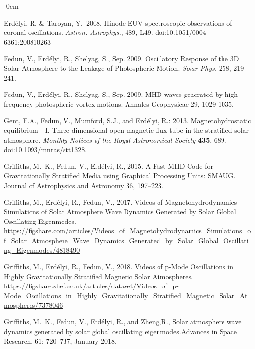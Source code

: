 \documentclass[physics,article,submit,pdftex,moreauthors]{Definitions/mdpi}
\newcommand{\aap}{{\it Astron. Astrophys.}}
\newcommand{\solphys}{{\it Solar Phys.}}
\begin{document}
\begin{adjustwidth}{-\extralength}{0cm}
\begin{thebibliography}{999}
 Erd{\'e}lyi, R. \& Taroyan, Y.\ 2008. {Hinode EUV spectroscopic observations of coronal oscillations}. \aap, 489, L49. doi:10.1051/0004-6361:200810263

{Fedun}, V., {Erd{\'e}lyi}, R., {Shelyag}, S., Sep. 2009. {Oscillatory Response
  of the 3D Solar Atmosphere to the Leakage of Photospheric Motion}. \solphys
  258, 219--241.

{Fedun}, V., {Erd{\'e}lyi}, R., {Shelyag}, S., Sep. 2009. {MHD waves generated by high-frequency photospheric vortex motions}. Annales Geophysicae
  29, 1029-1035.

Gent, F.A., Fedun, V., Mumford, S.J., and Erd{\'e}lyi, R.: 2013. {Magnetohydrostatic equilibrium - I. Three-dimensional open magnetic flux tube in the stratified solar atmosphere}. {\it Monthly Notices of the Royal Astronomical Society} {\bf 435}, 689. doi:10.1093/mnras/stt1328.


{Griffiths}, M.~K., {Fedun}, V., {Erd{\'e}lyi}, R., 2015. {A Fast MHD Code for
  Gravitationally Stratified Media using Graphical Processing Units: SMAUG}.
  Journal of Astrophysics and Astronomy 36, 197--223.

{Griffiths}, M., {Erd{\'e}lyi}, R., {Fedun}, V., 2017. {Videos of
  Magnetohydrodynamics Simulations of Solar Atmosphere Wave Dynamics Generated
  by Solar Global Oscillating Eigenmodes}.
\newline \url{https://figshare.com/articles/Videos_of_Magnetohydrodynamics_Simulations_of_Solar_Atmosphere_Wave_Dynamics_Generated_by_Solar_Global_Oscillating_Eigenmodes/4818490}

{Griffiths}, M., {Erd{\'e}lyi}, R., {Fedun}, V., 2018. {Videos of p-Mode Oscillations in Highly Gravitationally Stratified Magnetic Solar Atmospheres}.
\newline \url{https://figshare.shef.ac.uk/articles/dataset/Videos_of_p-Mode_Oscillations_in_Highly_Gravitationally_Stratified_Magnetic_Solar_Atmospheres/7378046}

{Griffiths}, M.~K., {Fedun}, V., {Erd{\'e}lyi}, R., and {Zheng},R.,
{Solar atmosphere wave dynamics generated by solar global oscillating
  eigenmodes}.{Advances in Space Research}, 61: 720--737, January 2018.


\end{thebibliography}
\end{adjustwidth}
\end{document}
